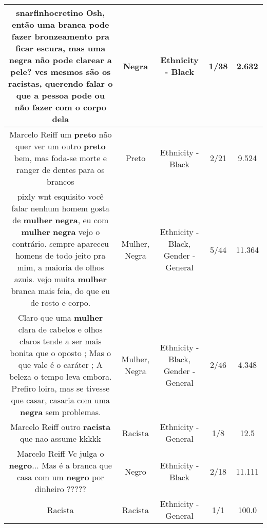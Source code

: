 \documentclass[11pt]{article}
\newlength\mylength
\begin{document}
\begin{center}
\begin{longtable}{|C{.65\mylength}|C{.30\mylength}|C{.12\mylength}|C{.12\mylength}|C{.12\mylength}|}
  \small snarfinhocretino Osh, então uma branca pode fazer bronzeamento pra ficar escura, mas uma \textbf{negra} não pode clarear a pele? vcs mesmos são os racistas, querendo falar o que a pessoa pode ou não fazer com o corpo dela\normalsize   & Negra & Ethnicity - Black & 1/38 & 2.632 \\  \hline
  \small Marcelo Reiff um \textbf{preto} não quer ver um outro \textbf{preto} bem, mas foda-se morte e ranger de dentes para os brancos\normalsize   & Preto & Ethnicity - Black & 2/21 & 9.524 \\  \hline
  \small pixly wnt esquisito você falar nenhum homem gosta de \textbf{mulher} \textbf{negra}, eu com \textbf{mulher} \textbf{negra} vejo o contrário. sempre apareceu homens de todo jeito pra mim, a maioria de olhos azuis. vejo muita \textbf{mulher} branca mais feia, do que eu de rosto e corpo.\normalsize   & Mulher, Negra & Ethnicity - Black, Gender - General & 5/44 & 11.364 \\  \hline
  \small Claro que uma \textbf{mulher} clara de cabelos e olhos claros tende a ser mais bonita que o oposto ; Mas o que vale é o caráter ; A beleza o tempo leva embora. Prefiro loira,  mas se tivesse que casar,  casaria com uma \textbf{negra} sem problemas.\normalsize   & Mulher, Negra & Ethnicity - Black, Gender - General & 2/46 & 4.348 \\  \hline
  \small Marcelo Reiff outro \textbf{racista} que nao assume kkkkk\normalsize   & Racista & Ethnicity - General & 1/8 & 12.5 \\  \hline
  \small Marcelo Reiff Vc julga o \textbf{negro}... Mas é a branca que casa com um \textbf{negro} por dinheiro ?????\normalsize   & Negro & Ethnicity - Black & 2/18 & 11.111 \\  \hline
  \small Racista\normalsize   & Racista & Ethnicity - General & 1/1 & 100.0 \\  \hline

\end{longtable}
\end{center}
\end{document}
